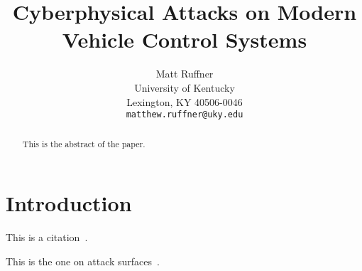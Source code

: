 \documentclass[10pt,twocolumn,letterpaper]{article}
\begin{document}
\title{ Cyberphysical Attacks on Modern Vehicle Control Systems}

\author{Matt Ruffner\\
University of Kentucky\\
Lexington, KY 40506-0046\\
{\tt\small matthew.ruffner@uky.edu}}


\maketitle

\begin{abstract}
  This is the abstract of the paper.
\end{abstract}

\section{Introduction}

This is a citation~\cite{KoscherKarl2010ESAo}.

This is the one on attack surfaces~\cite{Checkoway:2011:CEA:2028067.2028073}.





{\small


}
\end{document}

